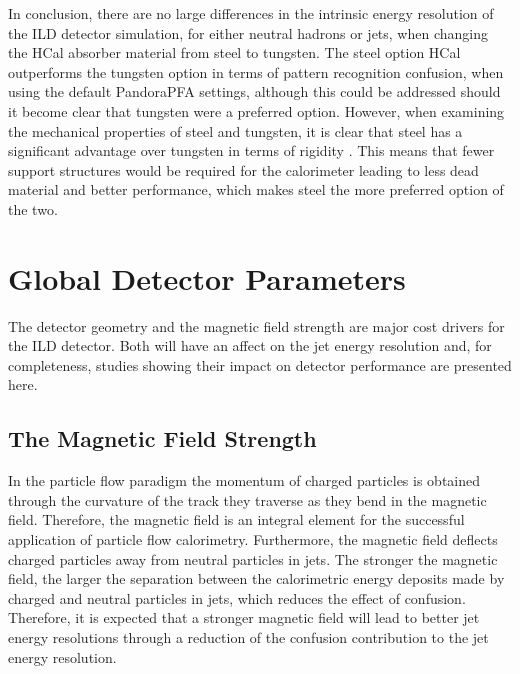 In conclusion, there are no large differences in the intrinsic energy resolution of the ILD detector simulation, for either neutral hadrons or jets, when changing the HCal absorber material from steel to tungsten.  The steel option HCal outperforms the tungsten option in terms of pattern recognition confusion, when using the default PandoraPFA settings, although this could be addressed should it become clear that tungsten were a preferred option.  However, when examining the mechanical properties of steel and tungsten, it is clear that steel has a significant advantage over tungsten in terms of rigidity \cite{Linssen:2012hp}.  This means that fewer support structures would be required for the calorimeter leading to less dead material and better performance, which makes steel the more preferred option of the two.


\section{Global Detector Parameters}
The detector geometry and the magnetic field strength are major cost drivers for the ILD detector.  Both will have an affect on the jet energy resolution and, for completeness, studies showing their impact on detector performance are presented here.


\subsection{The Magnetic Field Strength}
\label{sec:bfield}
In the particle flow paradigm the momentum of charged particles is obtained through the curvature of the track they traverse as they bend in the magnetic field.  Therefore, the magnetic field is an integral element for the successful application of particle flow calorimetry.  Furthermore, the magnetic field deflects charged particles away from neutral particles in jets.  The stronger the magnetic field, the larger the separation between the calorimetric energy deposits made by charged and neutral particles in jets, which reduces the effect of confusion.  Therefore, it is expected that a stronger magnetic field will lead to better jet energy resolutions through a reduction of the confusion contribution to the jet energy resolution.  

